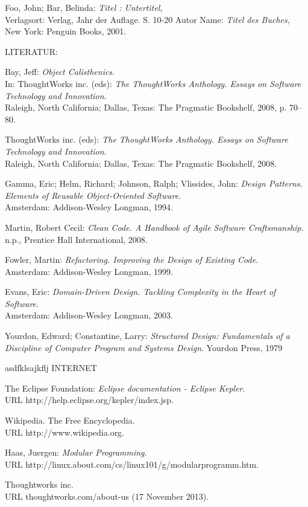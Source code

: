 \documentclass[12pt,a4paper,oneside, 
liststotoc, 					%
bibtotoc,						%
titlepage, 						%
headsepline, 					%
BCOR6mm,						%
english
]{scrreprt}
\begin{document}
\begin{thebibliography}{999999}

 Foo, John; Bar, Belinda: \emph{Titel : Untertitel},\\ Verlagsort: Verlag, Jahr der Auflage. S. 10-20
 Autor Name: \emph{Titel des Buches}, New York: Penguin Books, 2001.

LITERATUR: 

 Bay, Jeff: 
\emph{Object Calisthenics}. \\ In: ThoughtWorks inc. (eds): 
\emph{The ThoughtWorks Anthology. Essays on Software Technology and Innovation}. \\ Raleigh, North California; Dallas, Texas: The Pragmatic Bookshelf, 2008, p. 70--80.

 ThoughtWorks inc. (eds): 
\emph{The ThoughtWorks Anthology. Essays on Software Technology and Innovation}. \\ Raleigh, North California; Dallas, Texas: The Pragmatic Bookshelf, 2008.

 Gamma, Eric; Helm, Richard; Johnson, Ralph; Vlissides,  John:
\emph{Design Patterns. Elements of Reusable Object-Oriented Software}. \\ Amsterdam: Addison-Wesley Longman, 1994.
  
 Martin, Robert Cecil:
\emph{Clean Code. A Handbook of Agile Software Craftsmanship}. \\ n.p., Prentice Hall International, 2008.

 Fowler, Martin:
\emph{Refactoring. Improving the Design of Existing Code}. \\ Amsterdam: Addison-Wesley Longman, 1999. 

 Evans, Eric:
\emph{Domain-Driven Design. Tackling Complexity in the Heart of Software}. \\ Amsterdam: Addison-Wesley Longman, 2003. 

 Yourdon, Edward; Constantine, Larry:
\emph{Structured Design: Fundamentals of a Discipline of Computer Program and Systems Design}. Yourdon Press, 1979

asdfklsajkflj INTERNET


 The Eclipse Foundation: 
\emph{Eclipse documentation - Eclipse Kepler}. \\ URL http://help.eclipse.org/kepler/index.jsp.

 Wikipedia. The Free Encyclopedia. \\ URL http://www.wikipedia.org. 

 Haas, Juergen: \emph{Modular Programming}.\\ URL http://linux.about.com/cs/linux101/g/modularprogramm.htm.

 Thoughtworks inc. \\ URL thoughtworks.com/about-us  (17 November 2013).

\end{thebibliography}
\end{document}
